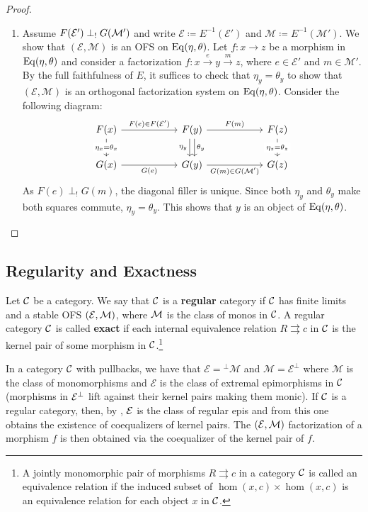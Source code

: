 \begin{proof}
\begin{enumerate}
   \item Assume $F(\mathcal{E}')\perp_! G(\mathcal{M}')$ and write $\mathcal{E}\coloneqq E^{-1}(\mathcal{E}')$ and $\mathcal{M} \coloneqq E^{-1}(\mathcal{M}')$. We show that $(\mathcal{E},\mathcal{M})$ is an OFS on $\mathrm{Eq}(\eta,\theta)$. Let $f\colon x\to z$ be a morphism in $\mathrm{Eq}(\eta,\theta)$ and consider a factorization $f\colon x\xrightarrow{e}y\xrightarrow{m}z$, where $e\in \mathcal{E}'$ and $m\in \mathcal{M}'$. By the full faithfulness of $E$, it suffices to check that $\eta_y = \theta_y$ to show that $(\mathcal{E},\mathcal{M})$ is an orthogonal factorization system on $\mathrm{Eq}(\eta,\theta)$.
   Consider the following diagram:
   \[
\begin{tikzcd}[column sep = 2cm]
F(x) \arrow[d, "\eta_x = \theta_x" description] \arrow[r, "F(e)\in F(\mathcal{E}')"] & F(y) \arrow[d, "\eta_y"', shift right] \arrow[d, "\theta_y", shift left] \arrow[r, "F(m)"] & F(z) \arrow[d, "\eta_z = \theta_z" description] \\
G(x) \arrow[r, "G(e)"']                                                 & G(y) \arrow[r, "G(m)\in G(\mathcal{M}')"']                                                              & G(z)
\end{tikzcd}
\]
   As $F(e)\perp_! G(m)$, the diagonal filler is unique. Since both $\eta_y$ and $\theta_y$ make both squares commute, $\eta_y = \theta_y$. This shows that $y$ is an object of $\mathrm{Eq}(\eta,\theta)$. \qedhere
\end{enumerate}
\end{proof}

\subsection{Regularity and Exactness}

\begin{definition}
   Let $\mathcal{C}$ be a category. We say that $\mathcal{C}$ is a \textbf{regular} category if $\mathcal{C}$ has finite limits and a stable OFS $(\mathcal{E},\mathcal{M})$, where $\mathcal{M}$ is the class of monos in $\mathcal{C}$. A regular category $\mathcal{C}$ is called \textbf{exact} if each internal equivalence relation $R\rightrightarrows c$ in $\mathcal{C}$ is the kernel pair of some morphism in $\mathcal{C}$.\footnote{A jointly monomorphic pair of morphisms $R\rightrightarrows c$ in a category $\mathcal{C}$ is called an equivalence relation if the induced subset of $\hom(x,c)\times \hom(x,c)$ is an equivalence relation for each object $x$ in $\mathcal{C}$.}
\end{definition}

In a category $\mathcal{C}$ with pullbacks, we have that $\mathcal{E} =\! ^\perp\! \mathcal{M}$ and $\mathcal{M} = \mathcal{E}^\perp$ where $\mathcal{M}$ is the class of monomorphisms and $\mathcal{E}$ is the class of extremal epimorphisms in $\mathcal{C}$ (morphisms in $\mathcal{E}^\bot$ lift against their kernel pairs making them monic). If $\mathcal{C}$ is a regular category, then, by \cite[Proposition 2.2(b)]{Kelly1991}, $\mathcal{E}$ is the class of regular epis and from this one obtains the existence of coequalizers of kernel pairs. The $(\mathcal{E},\mathcal{M})$ factorization of a morphism $f$ is then obtained via the coequalizer of the kernel pair of $f$. 


